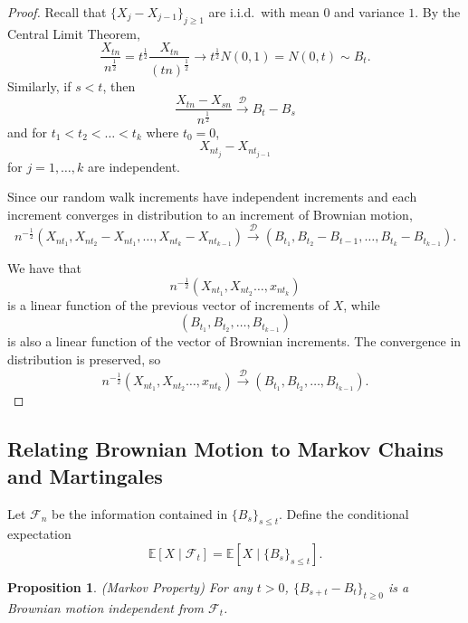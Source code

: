 \documentclass{tufte-handout}
\newcommand*\E{\mathbb{E}}
\newtheorem{prop}[thm]{Proposition}
\theoremstyle{definition}
\begin{document}
\begin{proof}
	Recall that $\{X_j - X_{j-1}\}_{j \ge 1}$ are i.i.d.\ with mean $0$ and variance $1$. By the Central Limit Theorem, \[
		\frac{X_{tn}}{n^{\frac{1}{2}}} =  t ^{\frac{1}{2}} \frac{X_{tn}}{\left( tn \right)^{\frac{1}{2}}} \to t ^{\frac{1}{2}} N(0,1) = N(0,t) \sim  B_t
	.\] Similarly, if $s <t$, then \[
		\frac{X_{tn} - X_{sn}}{n^{\frac{1}{2}}} \xrightarrow{\mathscr{D}} B_t - B_s
	\] and for $t_1 < t_2 < \ldots < t_k$ where $t_0 = 0$, \[
		X_{nt_j} - X_{nt_{j-1}}
	\] for $j=1,\ldots,k$ are independent.

	Since our random walk increments have independent increments and each increment converges in distribution to an increment of Brownian motion, \[
		n^{-\frac{1}{2}} \left( X_{nt_1}, X_{nt_2} - X_{nt_1}, \ldots, X_{nt_k} - X_{nt_{k-1}} \right) \xrightarrow{\mathscr{D}} \left( B_{t_1}, B_{t_2} - B_{t-1},\ldots,B_{t_k} - B_{t_{k-1}} \right)
	.\] 

	We have that \[
		n^{-\frac{1}{2}} \left( X_{nt_1},X_{nt_2}\ldots,x_{nt_k} \right)
	\] is a linear function of the previous vector of increments of $X$, while \[
	\left( B_{t_1},B_{t_2},\ldots,B_{t_{k-1}} \right)
	\] is also a linear function of the vector of Brownian increments. The convergence in distribution is preserved, so \[
		n^{-\frac{1}{2}} \left( X_{nt_1},X_{nt_2}\ldots,x_{nt_k} \right) \xrightarrow{\mathscr{D}} 	\left( B_{t_1},B_{t_2},\ldots,B_{t_{k-1}} \right)
	.\] 
\end{proof}

\subsection{Relating Brownian Motion to Markov Chains and Martingales}

Let $\mathscr{F}_n$ be the information contained in $\{B_s\}_{s \le t}$. Define the conditional expectation \[
	\E\left[X \mid \mathscr{F}_t\right] = \E\left[X \mid \{B_s\}_{s\le t}\right] 
.\]

\begin{prop}
	(Markov Property) For any $t >0$, $\{B_{s+t} - B_t\}_{t \ge 0}$ is a Brownian motion independent from $\mathscr{F}_t$.
\end{prop}
\end{document}
